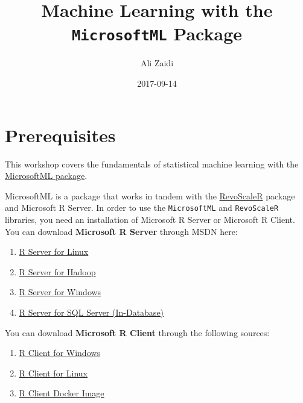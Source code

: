 \documentclass[]{book}
\title{Machine Learning with the \texttt{MicrosoftML} Package}
\author{Ali Zaidi}
\date{2017-09-14}
\providecommand{\tightlist}{%
  \setlength{\itemsep}{0pt}\setlength{\parskip}{0pt}}
\theoremstyle{definition}
\theoremstyle{definition}
\theoremstyle{definition}
\theoremstyle{remark}
\begin{document}
\maketitle

{
\setcounter{tocdepth}{1}
\tableofcontents
}
\chapter{Prerequisites}\label{prerequisites}

This workshop covers the fundamentals of statistical machine learning
with the
\href{https://msdn.microsoft.com/en-us/microsoft-r/microsoftml-introduction}{MicrosoftML
package}.

MicrosoftML is a package that works in tandem with the
\href{https://msdn.microsoft.com/en-us/microsoft-r/scaler-getting-started}{RevoScaleR}
package and Microsoft R Server. In order to use the \texttt{MicrosoftML}
and \texttt{RevoScaleR} libraries, you need an installation of Microsoft
R Server or Microsoft R Client. You can download \textbf{Microsoft R
Server} through MSDN here:

\begin{enumerate}
\def\labelenumi{\arabic{enumi}.}
\tightlist
\item
  \href{https://msdn.microsoft.com/en-us/microsoft-r/rserver-install-linux-server}{R
  Server for Linux}
\item
  \href{https://msdn.microsoft.com/en-us/microsoft-r/rserver-install-hadoop}{R
  Server for Hadoop}
\item
  \href{https://msdn.microsoft.com/en-us/microsoft-r/rserver-install-windows}{R
  Server for Windows}
\item
  \href{https://docs.microsoft.com/en-us/sql/advanced-analytics/r/set-up-sql-server-r-services-in-database}{R
  Server for SQL Server (In-Database)}
\end{enumerate}

You can download \textbf{Microsoft R Client} through the following
sources:

\begin{enumerate}
\def\labelenumi{\arabic{enumi}.}
\tightlist
\item
  \href{https://msdn.microsoft.com/en-us/microsoft-r/r-client-install-windows}{R
  Client for Windows}
\item
  \href{https://msdn.microsoft.com/en-us/microsoft-r/r-client-install-linux}{R
  Client for Linux}
\item
  \href{https://github.com/akzaidi/mrclient-docker}{R Client Docker
  Image}
\end{enumerate}
\end{document}
